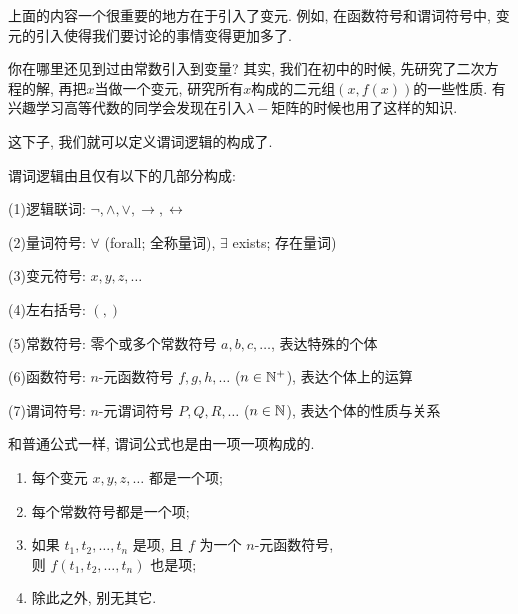 上面的内容一个很重要的地方在于引入了变元. 例如, 在函数符号和谓词符号中, 变元的引入使得我们要讨论的事情变得更加多了. 

\begin{bonus}
	你在哪里还见到过由常数引入到变量? 其实, 我们在初中的时候, 先研究了二次方程的解, 再把$x$当做一个变元, 研究所有$x$构成的二元组$(x,f(x))$的一些性质. 有兴趣学习高等代数的同学会发现在引入$\lambda-\text{矩阵}$的时候也用了这样的知识. 
\end{bonus}

这下子, 我们就可以定义谓词逻辑的构成了. 

\begin{definition}[谓词逻辑的构成] 谓词逻辑由且仅有以下的几部分构成: 

      (1)逻辑联词: $\lnot, \land, \lor, \to, \leftrightarrow$
      
      (2)量词符号:  $\forall$ (forall; 全称量词),
        $\exists$ exists; 存在量词)
      
      (3)变元符号: $x, y, z, \dots$
      
      (4)左右括号: $(, )$
      
      (5)常数符号: 零个或多个常数符号 $a, b, c, \dots$, 表达特殊的个体
      
      (6)函数符号: $n$-元函数符号 $f, g, h, \dots$ ($n \in \mathbb{N}^{+}$), 表达个体上的运算
      
      (7)谓词符号:  $n$-元谓词符号 $P, Q, R, \dots$ ($n \in \mathbb{N}$), 表达个体的性质与关系
    
\end{definition}





和普通公式一样, 谓词公式也是由一项一项构成的.

\begin{definition}[项 (Term)]
  \begin{enumerate}
    \item 每个变元 $x, y, z, \dots$ 都是一个项;
    \item 每个常数符号都是一个项;
    \item 如果 $t_{1}, t_{2}, \dots, t_{n}$ 是项,
      且 $f$ 为一个 $n$-元函数符号, \\
      则 $f(t_{1}, t_{2}, \dots, t_{n})$ 也是项;
    \item 除此之外, 别无其它. 
  \end{enumerate}
\end{definition}

